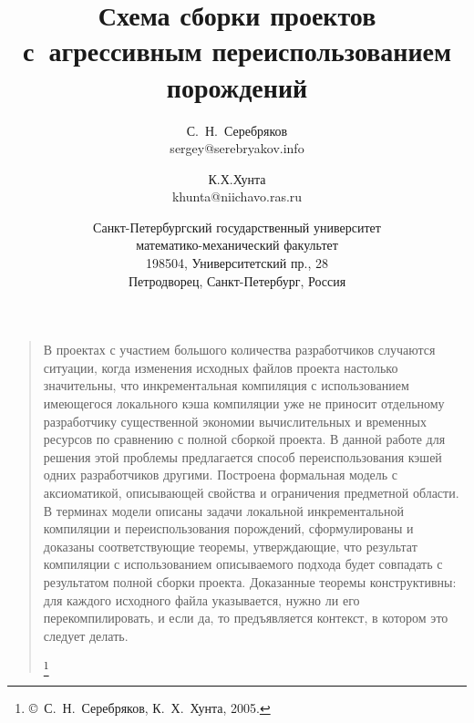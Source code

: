 \documentclass[a5paper]{article}
\title{Схема сборки проектов\\
с~агрессивным переиспользованием порождений}
\author{С.~Н.~Серебряков\\
sergey@serebryakov.info\\
\and
К.Х.Хунта\\
khunta@niichavo.ras.ru\\
\and Санкт-Петербургский государственный университет\\
математико-механический факультет\\
198504, Университетский пр., 28\\
Петродворец, Санкт-Петербург, Россия}
\date{}
\begin{document}
\maketitle
\thispagestyle{empty}

\begin{quote}
\small\noindent В проектах с участием большого количества разработчиков случаются ситуации, когда изменения исходных файлов проекта настолько значительны, что инкрементальная компиляция с использованием имеющегося локального кэша компиляции уже не приносит отдельному разработчику существенной экономии вычислительных и временных ресурсов по сравнению с полной сборкой проекта.
В данной работе для решения этой проблемы предлагается способ переиспользования кэшей одних разработчиков другими. Построена формальная модель с аксиоматикой, описывающей свойства и ограничения предметной области. В терминах модели описаны задачи локальной инкрементальной компиляции и переиспользования порождений, сформулированы и доказаны соответствующие теоремы, утверждающие, что результат компиляции с использованием описываемого подхода будет совпадать с результатом полной сборки проекта. Доказанные теоремы конструктивны: для каждого исходного файла указывается, нужно ли его перекомпилировать, и если да, то предъявляется контекст, в котором это следует делать.

\renewcommand{\thefootnote}{}

\footnote{\small{\copyright~С.~Н.~Серебряков, К.~Х.~Хунта, 2005.}}
\renewcommand{\thefootnote}{\arabic{footnote}}
\setcounter{footnote}{0}
\end{quote}

\end{document}
